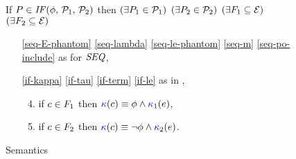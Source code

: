 \begin{figure}
\begin{multicols}{2}
  \end{multicols}
  \medskip

  \noindent
  If $\aPS \in \sIF{\aForm}\sTHEN\aPSS_1\sELSE\aPSS_2\sFI$ then
  $(\exists P_1\in\mathcal{P}_1)$ $(\exists P_2\in\mathcal{P}_2)$
  $(\exists F_1\subseteq\mathcal{E})$ $(\exists F_2\subseteq\mathcal{E})$
  \begin{multicols}{2}
    \begin{enumerate}[topsep=0pt,label=(\textsc{i}\arabic*),ref=\textsc{i}\arabic*]

    \item[\eqref{seq-E-phantom}]
      \eqref{seq-lambda}\;
      \eqref{seq-le-phantom}\;
      \eqref{seq-m}\;
      \eqref{seq-po-include}\;
      as for $\sSEMI{}{}$,

    \item[\eqref{if-kappa}]
      \eqref{if-tau}\;
      \eqref{if-term}\; 
      \eqref{if-le}\;
      as in ,

      \columnbreak
      \setcounter{enumi}{\value{kappa}}
    \item[] 
      \begin{enumerate}[leftmargin=0pt]
        \setcounter{enumii}{3}
      \item \label{if-kappa-phantom1}
        if $c\in F_1$ then ${\color{blue}\kappa}(c) \mathrel{\equiv} \phi\land{\color{blue}\kappa}_1(e)$,
      \item \label{if-kappa-phantom2} 
        if $c\in F_2$ then ${\color{blue}\kappa}(c) \mathrel{\equiv} \lnot\phi\land{\color{blue}\kappa}_2(e)$.
      \end{enumerate}      

      
    \end{enumerate}
  \end{multicols}
  \medskip

  \caption{\PwTcTITLE{} Semantics}
  \label{fig:c11}
\end{figure}
